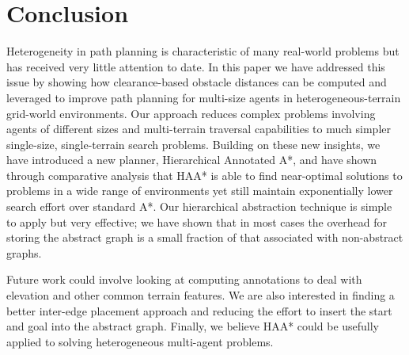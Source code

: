 \section{Conclusion} 
Heterogeneity in path planning is characteristic of many real-world problems but has received very little attention to date.
In this paper we have addressed this issue by showing how clearance-based obstacle distances can be computed and leveraged to improve path planning for multi-size agents in heterogeneous-terrain grid-world environments. 
Our approach reduces complex problems involving agents of different sizes and multi-terrain traversal capabilities to much simpler single-size, single-terrain search problems.
Building on these new insights, we have introduced a new planner, Hierarchical Annotated A*,  and have shown through comparative analysis that HAA* is able to find near-optimal solutions to problems in a wide range of environments yet still maintain exponentially lower search effort over standard A*.
Our hierarchical abstraction technique is simple to apply but very effective; we have shown that in most cases the overhead for storing the abstract graph is a small fraction of that associated with non-abstract graphs.
\par \indent
Future work could involve looking at computing annotations to deal with elevation and other common terrain features. 
We are also interested in finding a better inter-edge placement approach and reducing the effort to insert the start and goal into the abstract graph.
Finally, we believe HAA* could be usefully applied to solving heterogeneous multi-agent problems.
